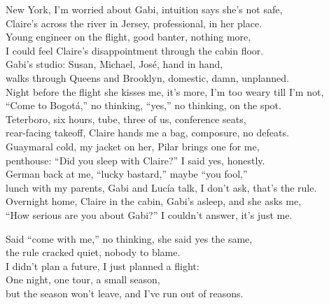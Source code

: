 \begin{lyrics}
New York, I’m worried about Gabi, intuition says she’s not safe,\\
Claire’s across the river in Jersey, professional, in her place.\\
Young engineer on the flight, good banter, nothing more,\\
I could feel Claire’s disappointment through the cabin floor.\\
Gabi’s studio: Susan, Michael, José, hand in hand,\\
walks through Queens and Brooklyn, domestic, damn, unplanned.\\
Night before the flight she kisses me, it’s more, I’m too weary till I’m not,\\
“Come to Bogotá,” no thinking, “yes,” no thinking, on the spot.\\
Teterboro, six hours, tube, three of us, conference seats,\\
rear-facing takeoff, Claire hands me a bag, composure, no defeats.\\
Guaymaral cold, my jacket on her, Pilar brings one for me,\\
penthouse: “Did you sleep with Claire?” I said yes, honestly.\\
German back at me, “lucky bastard,” maybe “you fool,”\\
lunch with my parents, Gabi and Lucía talk, I don’t ask, that’s the rule.\\
Overnight home, Claire in the cabin, Gabi’s asleep, and she asks me,\\
“How serious are you about Gabi?” I couldn’t answer, it’s just me.

Said “come with me,” no thinking, she said yes the same,\\
the rule cracked quiet, nobody to blame.\\
I didn’t plan a future, I just planned a flight:\\
One night, one tour, a small season,\\
but the season won’t leave, and I’ve run out of reasons.


\end{lyrics}
